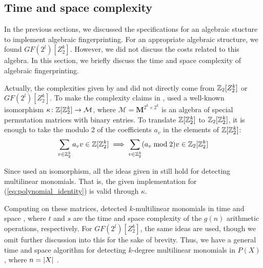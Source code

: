 \subsection{Time and space complexity}
\label{sect:complexity}

In the previous sections, we discussed the specifications 
for an algebraic stucture to implement algebraic fingerprinting. 
For an appropriate algebraic structure, we found $GF(2^{l})[Z_2^k]$. 
However, we did not discuss the costs related 
to this algebra. In this section, we briefly discuss the time and space complexity 
of algebraic fingerprinting.
%

Actually, the complexities given by \textcite{Koutis08} and 
\textcite{Williams09} did not directly come from 
$\mathbb Z_2[Z_2^k]$ or $GF(2^{l})[Z_2^k]$. 
To make the complexity claims in \cite{Koutis08}, 
\citeauthor{Koutis08} used a well-known \cite{Terras99} isomorphism 
$\kappa \colon \mathbb Z[\mathbb Z_2^k] \to \mathcal{M}$, where $\mathcal{M} = \mathbf{M}^{2^k \times 2^k}$ 
is an algebra of special permutation matrices with binary entries. To translate $\mathbb Z[\mathbb Z_2^k]$ to 
$\mathbb Z_2[\mathbb Z_2^k]$, it is enough to take the modulo 2 of the coefficients $a_v$ in 
the elements of $\mathbb Z[\mathbb Z_2^k]$: 
\[
  \sum_{v \in \mathbb Z_2^k}a_v v \in \mathbb Z[\mathbb Z_2^k] \implies 
  \sum_{v \in \mathbb Z_2^k}(a_v \bmod 2) v \in \mathbb Z_2[\mathbb Z_2^k]
\]

Since \citeauthor{Koutis08} 
used an isomorphism, all the ideas given in 
 still hold for 
detecting multilinear monomials. That is, 
the given implementation for (\ref{eq:polynomial_identity}) 
is valid through $\kappa$.

Computing on these matrices, 
\textcite{Koutis08} detected $k$-multilinear monomials 
in time  and space , where $t$ and $s$ are the time 
and space complexity of the $g(n)$ arithmetic operations, respectively. 
For $GF(2^{l})[Z_2^k]$, the same ideas are used, though we omit 
further discussion into this for the sake of brevity. 
Thus, we have a general 
 time and  space algorithm for detecting 
$k$-degree multilinear monomials in $P(X)$, where $n = {\left\vert X\right\vert}$ \cite{KouWil09}.

